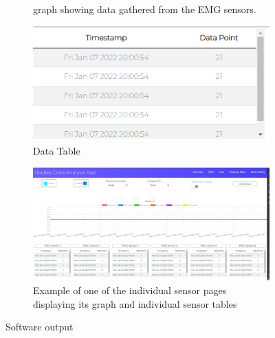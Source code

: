 \begin{figure}[h]
\begin{subfigure}[h]{0.45\textwidth}
         \caption{graph showing data gathered from the EMG sensors.}
         \label{fig:graph}
     \end{subfigure}
     \begin{subfigure}[h]{0.45\textwidth}
         \centering
         \includegraphics[width=\textwidth]{Progress_Report/figs/data_table.png}
         \caption{Data Table}
         \label{fig:table}
     \end{subfigure}
     \begin{subfigure}[h]{\textwidth}
         \centering
         \includegraphics[width=\textwidth]{Progress_Report/figs/graph_table.png}
         \caption{Example of one of the individual sensor pages displaying its graph and individual sensor tables}
         \label{fig:table}
     \end{subfigure}     
     
        \caption{Software output}
        \label{fig:three graphs}
\end{figure}




